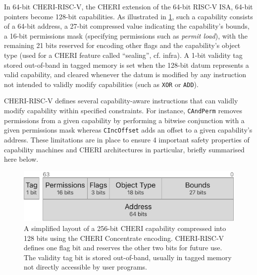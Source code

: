 \documentclass[main.tex]{subfiles}
\begin{document}
In 64-bit CHERI-RISC-V, the CHERI extension of the 64-bit RISC-V ISA, 64-bit pointers become 128-bit capabilities. As illustrated in \cref{fig:chericoncentrate}, such a capability consists of a 64-bit address, a 27-bit compressed value indicating the capability’s bounds, a 16-bit permissions mask (specifying permissions such as \emph{permit load}), with the remaining 21 bits reserved for encoding other flags and the capability’s object type (used for a CHERI feature called \enquote{\gls*{sealing}}, cf. infra). A 1-bit validity tag stored out-of-band in tagged memory is set when the 128-bit datum represents a valid capability, and cleared whenever the datum is modified by any instruction not intended to validly modify capabilities (such as \texttt{XOR} or \texttt{ADD}).

CHERI-RISC-V defines several capability-aware instructions that can validly modify capability within specified constraints. For instance, \texttt{CAndPerm} removes permissions from a given capability by performing a bitwise conjunction with a given permissions mask whereas \texttt{CIncOffset} adds an offset to a given capability's address. These limitations are in place to ensure 4 important safety properties of capability machines and CHERI architectures in particular, briefly summarised here below.

\begin{figure}
	\begin{center}
		\includegraphics{Images/CHERI Concentrate Layout.pdf}
	\end{center}
	\caption{A simplified layout of a 256-bit CHERI capability compressed into 128 bits using the CHERI Concentrate encoding. CHERI-RISC-V defines one flag bit and reserves the other two bits for future use. The validity tag bit is stored out-of-band, usually in tagged memory not directly accessible by user programs.}
	\label{fig:chericoncentrate}
\end{figure}
\end{document}
